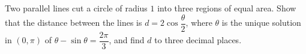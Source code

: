 Two parallel lines cut a circle of radius $1$ into three regions of equal area. Show that the distance between the lines is $d=2\cos\dfrac\theta2$, where $\theta$ is the unique solution in $(0,\pi)$ of $\theta-\sin\theta=\dfrac{2\pi}{3}$, and find $d$ to three decimal places.
